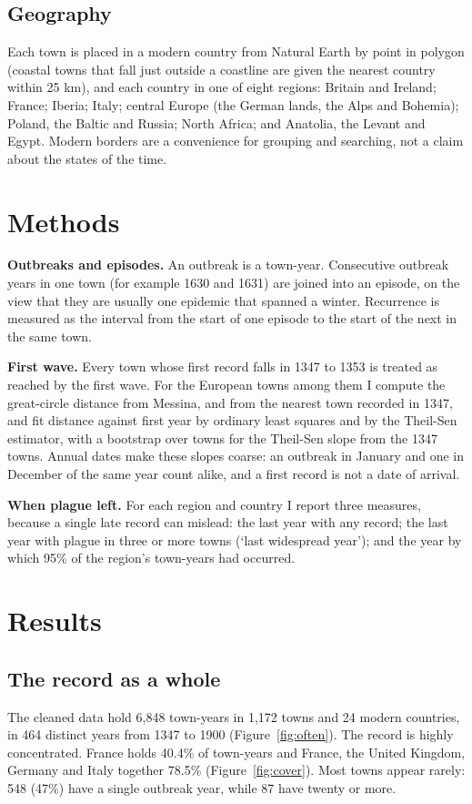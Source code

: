 \documentclass[11pt,a4paper]{article}
\begin{document}
\subsection{Geography}
Each town is placed in a modern country from Natural Earth \citep{naturalearth} by point in polygon (coastal towns that fall just outside a coastline are given the nearest country within 25 km), and each country in one of eight regions: Britain and Ireland; France; Iberia; Italy; central Europe (the German lands, the Alps and Bohemia); Poland, the Baltic and Russia; North Africa; and Anatolia, the Levant and Egypt. Modern borders are a convenience for grouping and searching, not a claim about the states of the time.

\section{Methods}
\textbf{Outbreaks and episodes.} An outbreak is a town-year. Consecutive outbreak years in one town (for example 1630 and 1631) are joined into an episode, on the view that they are usually one epidemic that spanned a winter. Recurrence is measured as the interval from the start of one episode to the start of the next in the same town.

\textbf{First wave.} Every town whose first record falls in 1347 to 1353 is treated as reached by the first wave. For the European towns among them I compute the great-circle distance from Messina, and from the nearest town recorded in 1347, and fit distance against first year by ordinary least squares and by the Theil-Sen estimator, with a bootstrap over towns for the Theil-Sen slope from the 1347 towns. Annual dates make these slopes coarse: an outbreak in January and one in December of the same year count alike, and a first record is not a date of arrival.

\textbf{When plague left.} For each region and country I report three measures, because a single late record can mislead: the last year with any record; the last year with plague in three or more towns (`last widespread year'); and the year by which 95\% of the region's town-years had occurred.

\section{Results}
\subsection{The record as a whole}
The cleaned data hold 6,848 town-years in 1,172 towns and 24 modern countries, in 464 distinct years from 1347 to 1900 (Figure~\ref{fig:often}). The record is highly concentrated. France holds 40.4\% of town-years and France, the United Kingdom, Germany and Italy together 78.5\% (Figure~\ref{fig:cover}). Most towns appear rarely: 548 (47\%) have a single outbreak year, while 87 have twenty or more.
\end{document}
